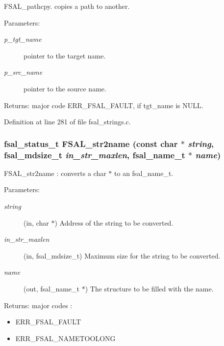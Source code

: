 FSAL\_\-pathcpy. copies a path to another.

\begin{Desc}
\item[Parameters:]
\begin{description}
\item[{\em p\_\-tgt\_\-name}]pointer to the target name. \item[{\em p\_\-src\_\-name}]pointer to the source name. \end{description}
\end{Desc}
\begin{Desc}
\item[Returns:]major code ERR\_\-FSAL\_\-FAULT, if tgt\_\-name is NULL. \end{Desc}


Definition at line 281 of file fsal\_\-strings.c.
\subsubsection[{FSAL\_\-str2name}]{\setlength{\rightskip}{0pt plus 5cm}fsal\_\-status\_\-t FSAL\_\-str2name (const char $\ast$ {\em string}, \/  fsal\_\-mdsize\_\-t {\em in\_\-str\_\-maxlen}, \/  fsal\_\-name\_\-t $\ast$ {\em name})}\label{group__FSALNameFunctions_gc4feea8f73f08361426af099c6f3b9c8}


FSAL\_\-str2name : converts a char $\ast$ to an fsal\_\-name\_\-t.

\begin{Desc}
\item[Parameters:]
\begin{description}
\item[{\em string}](in, char $\ast$) Address of the string to be converted. \item[{\em in\_\-str\_\-maxlen}](in, fsal\_\-mdsize\_\-t) Maximum size for the string to be converted. \item[{\em name}](out, fsal\_\-name\_\-t $\ast$) The structure to be filled with the name.\end{description}
\end{Desc}
\begin{Desc}
\item[Returns:]major codes :\begin{itemize}
\item ERR\_\-FSAL\_\-FAULT\item ERR\_\-FSAL\_\-NAMETOOLONG \end{itemize}
\end{Desc}


